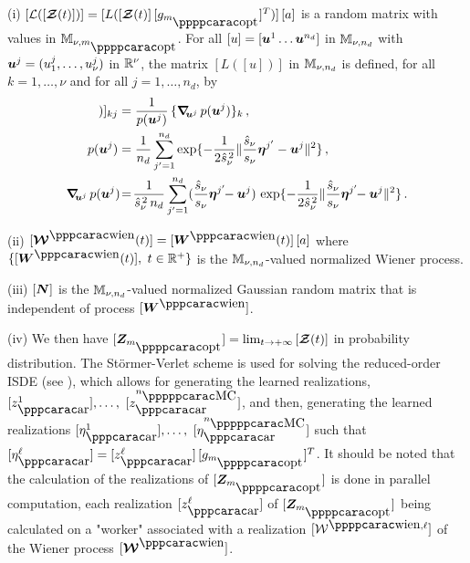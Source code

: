 \noindent (i) $[\curL([\bfcurZ(t)])]= [L ( [\bfcurZ(t)] \, [g_{m_\popt}]^T ) ] \, [a]$ is a random matrix  with values in $\MM_{\nu,m_\popt}$.
For all $[u] = [{\boldsymbol{u}}^1 \ldots {\boldsymbol{u}}^{n_d}]$ in ${\mathbb{M}}_{\nu,n_d}$ with ${\boldsymbol{u}}^j=(u^j_1,\ldots ,u^j_{\nu})$ in ${\mathbb{R}}^{\nu}$, the
matrix $[L([u])]$ in ${\mathbb{M}}_{\nu,n_d}$ is defined, for all $k = 1,\ldots ,\nu$ and for all $j=1,\ldots , n_d$, by
%
\begin{align}
[L([u])]_{kj} & = \frac{1}{p(\bfu^j)} \, \{{\boldsymbol{\nabla}}_{\!\!\bfu^j}\, p(\bfu^j) \}_k \, , \label{eqPLoM7} \\                                            p(\bfu^j)     & = \frac{1}{n_d} \sum_{j'=1}^{n_d}
        \exp\{ -\frac{1}{2 {\hat s_{\nu}}^{\, 2}}\Vert \frac{\hat s_{\nu}}{s_{\nu}}\bfeta^{j'}-\bfu^j\Vert^2 \}  \, , \nonumber \\
{\boldsymbol{\nabla}}_{\!\!\bfu^j}\, p(\bfu^j) \!& = \! \frac{1}{\hat s_{\nu}^{\,2} \, n_d} \sum_{j'=1}^{n_d} (\frac{\hat s_{\nu}}{s_{\nu}}\bfeta^{j'} \!\! -\bfu^j)
              \,\exp\{ -\frac{1}{2 \hat s_{\nu}^{\,2}}\Vert
             \frac{\hat s_{\nu}}{s_{\nu}}\bfeta^{j'}\!\! -\bfu^j\Vert^2 \} \, .  \nonumber
\end{align}
%

\noindent (ii) $[\bfcurW^\wien(t)] = [\bfW^\wien(t)] \, [a]$ where $\{[\bfW^\wien(t)],$ $t\in {\mathbb{R}}^+\}$ is the ${\mathbb{M}}_{\nu,n_d}$-valued normalized Wiener process.

\smallskip

\noindent (iii)  $[{\boldsymbol{N}}]$ is the ${\mathbb{M}}_{\nu,n_d}$-valued normalized Gaussian random matrix that is independent of process $[\bfW^\wien]$.

\smallskip

\noindent (iv)  We then have ${[\bfZ_{m_\popt}]} = \lim_{t\rightarrow +\infty} {[\bfcurZ(t)]}$ in probability distribution. The St\"{o}rmer-Verlet scheme is used for solving the reduced-order ISDE (see \cite{Soize2016}), which allows for generating the learned realizations, $[z_\ar^1], \ldots ,$ $[z_\ar^{n_\pMC}]$, and then, generating the learned realizations $[\eta_\ar^1],\ldots ,$ $[\eta_\ar^{n_\pMC}]$ such that $[\eta_\ar^\ell] = [z_\ar^\ell]\, [g_{m_\popt}]^T$. It should be noted that the calculation of the realizations of $[\bfZ_{m_\popt}]$ is done in parallel computation, each realization $[z_\ar^\ell]$ of  $[\bfZ_{m_\popt}]$ being calculated on a "worker" associated with a realization $[\curW^{\pwien,\ell}] $ of the Wiener process $[\bfcurW^\wien]$.

\smallskip

